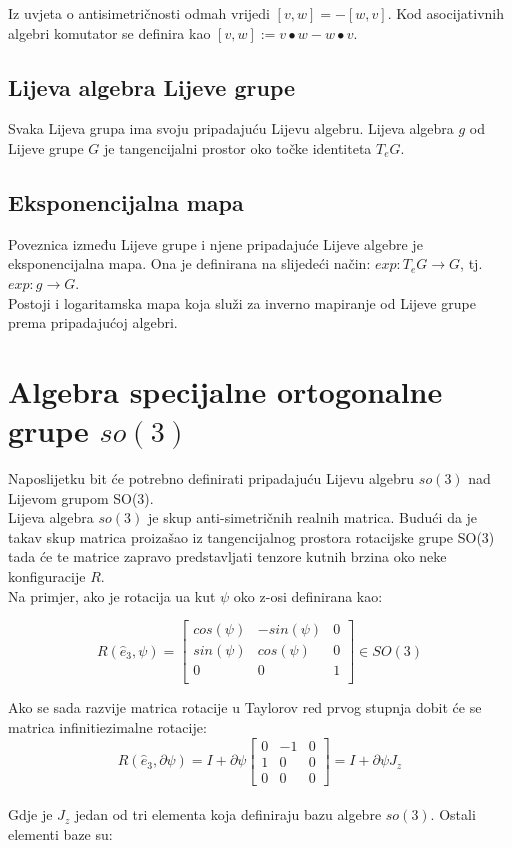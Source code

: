 \documentclass[times, utf8, diplomski]{fer}
\begin{document}
	Iz uvjeta o antisimetričnosti odmah vrijedi $[v,w]=-[w,v]$. Kod asocijativnih algebri komutator se definira kao $[v,w]:=v \bullet w - w \bullet v$.
	
	\subsection{Lijeva algebra Lijeve grupe} Svaka Lijeva grupa ima svoju pripadajuću Lijevu algebru. Lijeva algebra $g$ od Lijeve grupe $G$ je tangencijalni prostor oko točke identiteta $T_e G$.
	
	\subsection{Eksponencijalna mapa} Poveznica između Lijeve grupe i njene pripadajuće Lijeve algebre je eksponencijalna mapa. Ona je definirana na slijedeći način: $exp: T_eG \rightarrow	G$, tj. $exp: g \rightarrow G.$ \\ Postoji i logaritamska mapa koja služi za inverno mapiranje od Lijeve grupe prema pripadajućoj algebri.

\section{Algebra specijalne ortogonalne grupe $so(3)$}

	Naposlijetku bit će potrebno definirati pripadajuću Lijevu algebru $so(3)$ nad Lijevom grupom SO(3). \\
	Lijeva algebra $so(3)$ je skup anti-simetričnih realnih matrica. Budući da je takav skup matrica proizašao iz tangencijalnog prostora rotacijske grupe SO(3) tada će te matrice zapravo predstavljati tenzore kutnih brzina oko neke konfiguracije $R$. \\
	Na primjer, ako je rotacija ua kut $\psi$ oko z-osi definirana kao:
	
	\begin{equation}
		R( \hat{e}_3, \psi ) = 
		\begin{bmatrix}
			cos(\psi)	&	-sin(\psi)	&	0 \\
			sin(\psi)	&	cos(\psi)	&	0 \\
			0			&	0			&	1 \\	
		\end{bmatrix} \in SO(3)
	\end{equation}
	
	Ako se sada razvije matrica rotacije u Taylorov red prvog stupnja dobit će se matrica infinitiezimalne rotacije: \\
	\begin{equation}
		R( \hat{e}_3, \partial \psi ) = I + \partial \psi 
		\begin{bmatrix}
			0	&	-1	&	0 \\
			1	&	0	&	0 \\
			0	&	0 	&	0
		\end{bmatrix}
		= I + \partial \psi J_z
	\end{equation}
	\\
	\noindent Gdje je $J_z$ jedan od tri elementa koja definiraju bazu algebre $so(3)$. Ostali elementi baze su:
	
\end{document}
